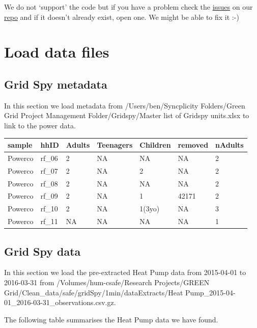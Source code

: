 \documentclass[]{article}
\begin{document}
We do not `support' the code but if you have a problem check the
\href{https://git.soton.ac.uk/ba1e12/nzGREENGrid/issues}{issues} on our
\href{https://git.soton.ac.uk/ba1e12/nzGREENGrid}{repo} and if it
doesn't already exist, open one. We might be able to fix it :-)

\section{Load data files}\label{load-data-files}

\subsection{Grid Spy metadata}\label{grid-spy-metadata}

In this section we load metadata from /Users/ben/Syncplicity
Folders/Green Grid Project Management Folder/Gridspy/Master list of
Gridspy units.xlsx to link to the power data.

\begin{longtable}[]{@{}lllllll@{}}
\toprule
sample & hhID & Adults & Teenagers & Children & removed &
nAdults\tabularnewline
\midrule
\endhead
Powerco & rf\_06 & 2 & NA & NA & NA & 2\tabularnewline
Powerco & rf\_07 & 2 & NA & 2 & NA & 2\tabularnewline
Powerco & rf\_08 & 2 & NA & NA & NA & 2\tabularnewline
Powerco & rf\_09 & 2 & NA & 1 & 42171 & 2\tabularnewline
Powerco & rf\_10 & 2 & NA & 1(3yo) & NA & 3\tabularnewline
Powerco & rf\_11 & NA & NA & NA & NA & 1\tabularnewline
\bottomrule
\end{longtable}

\subsection{Grid Spy data}\label{grid-spy-data}

In this section we load the pre-extracted Heat Pump data from 2015-04-01
to 2016-03-31 from /Volumes/hum-csafe/Research Projects/GREEN
Grid/Clean\_data/safe/gridSpy/1min/dataExtracts/Heat
Pump\_2015-04-01\_2016-03-31\_observations.csv.gz.

The following table summarises the Heat Pump data we have found.
\end{document}
